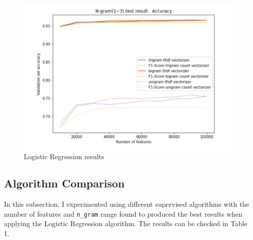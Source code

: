 \documentclass{article}
\begin{document}
	\begin{figure}[h]
		\label{Figure 14}
		\caption{Logistic Regression results}
		\includegraphics[scale=0.55]{LR.png}
		\centering
	\end{figure}


	\subsection{Algorithm Comparison}
	
	In this subsection, I experimented using different supervised algorithms with the number of features and \texttt{n\_gram} range found to produced the best results when applying the Logistic Regression algorithm. The results can be checked in Table 1. 
	
\end{document}
